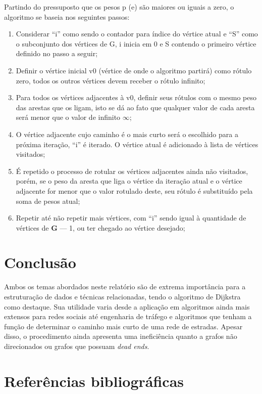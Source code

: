 \documentclass[a4paper, 12pt]{article}
\begin{document}
Partindo do pressuposto que os pesos p (e) são maiores ou iguais a zero, o algoritmo se baseia nos seguintes passos:

\begin{enumerate}
	\item Considerar ``i'' como sendo o contador para índice do vértice atual e ``S'' como o subconjunto dos vértices de G, i inicia em 0 e S contendo o primeiro vértice definido no passo a seguir;
	\item Definir o vértice inicial v0 (vértice de onde o algoritmo partirá) como rótulo zero, todos os outros vértices devem receber o rótulo infinito;
	\item Para todos os vértices adjacentes à v0, definir seus rótulos com o mesmo peso das arestas que os ligam, isto se dá ao fato que qualquer valor de cada aresta será menor que o valor de infinito {$\infty$};

	\item O vértice adjacente cujo caminho é o mais curto será o escolhido para a próxima iteração, ``i'' é iterado. O vértice atual é adicionado à lista de vértices visitados;
	\item É repetido o processo de rotular os vértices adjacentes ainda não visitados, porém, se o peso da aresta que liga o vértice da iteração atual e o vértice adjacente for menor que o valor rotulado deste, seu rótulo é substituído pela soma de pesos atual;
	\item Repetir até não repetir mais vértices, com ``i'' sendo igual à quantidade de vértices de \textbf{G} --- 1, ou ter chegado ao vértice desejado;

\end{enumerate}
\section{Conclusão}

Ambos os temas abordados neste relatório são de extrema importância para a estruturação de dados e técnicas relacionadas, tendo o algoritmo de Dijkstra como destaque. Sua utilidade varia desde a aplicação em algoritmos ainda mais extensos para redes sociais até engenharia de tráfego e algoritmos que tenham a função de determinar o caminho mais curto de uma rede de estradas. Apesar disso, o procedimento ainda apresenta uma ineficiência quanto a grafos não direcionados ou grafos que possuam \textit{dead ends}.

\section{Referências bibliográficas}
\end{document}
